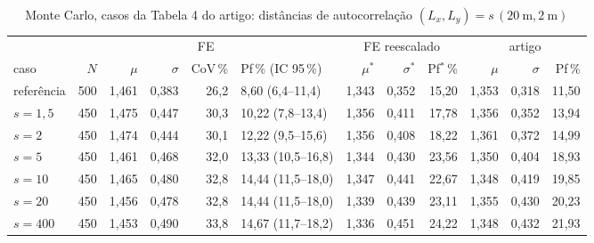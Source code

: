 \documentclass[11pt,a4paper]{article}
\begin{document}
\begin{table}[H]\centering\footnotesize\setlength{\tabcolsep}{3.2pt}\caption{Monte Carlo, casos da Tabela 4 do artigo: distâncias de autocorrelação $(L_x, L_y) = s\,(20\ \mathrm{m}, 2\ \mathrm{m})$}\label{tab:mc4}
\begin{tabular}{lrrrrlrrr>{\color{art}}r>{\color{art}}r>{\color{art}}r}\toprule & \multicolumn{5}{c}{FE} & \multicolumn{3}{c}{FE reescalado} & \multicolumn{3}{c}{\color{art}artigo}\\\cmidrule(lr){2-6}\cmidrule(lr){7-9}\cmidrule(l){10-12}caso & $N$ & $\mu$ & $\sigma$ & CoV\,\% & Pf\,\% (IC 95\,\%) & $\mu^*$ & $\sigma^*$ & Pf$^*$\,\% & $\mu$ & $\sigma$ & Pf\,\%\\\midrule
referência & 500 & 1{,}461 & 0{,}383 & 26{,}2 & 8{,}60 (6{,}4--11{,}4) & 1{,}343 & 0{,}352 & 15{,}20 & 1{,}353 & 0{,}318 & 11{,}50\\
$s = 1{,}5$ & 450 & 1{,}475 & 0{,}447 & 30{,}3 & 10{,}22 (7{,}8--13{,}4) & 1{,}356 & 0{,}411 & 17{,}78 & 1{,}356 & 0{,}352 & 13{,}94\\
$s = 2$ & 450 & 1{,}474 & 0{,}444 & 30{,}1 & 12{,}22 (9{,}5--15{,}6) & 1{,}356 & 0{,}408 & 18{,}22 & 1{,}361 & 0{,}372 & 14{,}99\\
$s = 5$ & 450 & 1{,}461 & 0{,}468 & 32{,}0 & 13{,}33 (10{,}5--16{,}8) & 1{,}344 & 0{,}430 & 23{,}56 & 1{,}350 & 0{,}404 & 18{,}93\\
$s = 10$ & 450 & 1{,}465 & 0{,}480 & 32{,}8 & 14{,}44 (11{,}5--18{,}0) & 1{,}347 & 0{,}441 & 22{,}67 & 1{,}348 & 0{,}419 & 19{,}85\\
$s = 20$ & 450 & 1{,}456 & 0{,}478 & 32{,}8 & 14{,}44 (11{,}5--18{,}0) & 1{,}339 & 0{,}439 & 23{,}11 & 1{,}355 & 0{,}430 & 20{,}23\\
$s = 400$ & 450 & 1{,}453 & 0{,}490 & 33{,}8 & 14{,}67 (11{,}7--18{,}2) & 1{,}336 & 0{,}451 & 24{,}22 & 1{,}348 & 0{,}432 & 21{,}93\\
\bottomrule\end{tabular}
\end{table}
\end{document}
